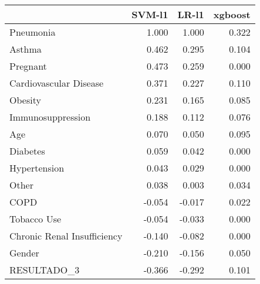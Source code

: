 \begin{tabular}{lrrr}
\toprule
{} &  SVM-l1 &  LR-l1 &  xgboost \\
\midrule
Pneumonia                   &   1.000 &  1.000 &    0.322 \\
Asthma                      &   0.462 &  0.295 &    0.104 \\
Pregnant                    &   0.473 &  0.259 &    0.000 \\
Cardiovascular Disease      &   0.371 &  0.227 &    0.110 \\
Obesity                     &   0.231 &  0.165 &    0.085 \\
Immunosuppression           &   0.188 &  0.112 &    0.076 \\
Age                         &   0.070 &  0.050 &    0.095 \\
Diabetes                    &   0.059 &  0.042 &    0.000 \\
Hypertension                &   0.043 &  0.029 &    0.000 \\
Other                       &   0.038 &  0.003 &    0.034 \\
COPD                        &  -0.054 & -0.017 &    0.022 \\
Tobacco Use                 &  -0.054 & -0.033 &    0.000 \\
Chronic Renal Insufficiency &  -0.140 & -0.082 &    0.000 \\
Gender                      &  -0.210 & -0.156 &    0.050 \\
RESULTADO\_3                 &  -0.366 & -0.292 &    0.101 \\
\bottomrule
\end{tabular}
